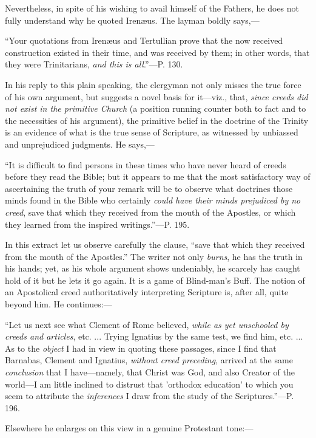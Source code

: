 Nevertheless, in spite of his wishing to avail
himself of the Fathers, he does not fully understand why he quoted
Irenæus. The layman boldly says,—

``Your
quotations from Irenæus and Tertullian prove that the now received
construction existed in their time, and was received by them; in other
words, that they were Trinitarians, \emph{and this is all}.''—P. 130.

In his reply to this plain speaking, the
clergyman not only misses the true force of his own argument, but
suggests a novel basis for it—viz., that, \emph{since creeds did not
exist in the primitive Church} (a position running counter both to
fact and to the necessities of his argument), the primitive belief in
the doctrine of the Trinity is an evidence of what is the true sense
of Scripture, as witnessed by unbiassed and unprejudiced judgments. He
says,—

``It
is difficult to find persons in these times who have never heard of
creeds before they read the Bible; but it appears to me that the most
satisfactory way of ascertaining the truth of your remark will be to
observe what doctrines those minds found in the Bible who certainly \emph{could
have their minds prejudiced by no creed}, save that which they
received from the mouth of the Apostles, or which they learned from
the inspired writings.''—P. 195.

In this extract let us observe carefully the
clause, ``save that which they received from the mouth of the Apostles.''
The writer not only \emph{burns}, he has the truth in his hands; yet,
as his whole argument shows undeniably, he scarcely has caught hold of
it but he lets it go again. It is a game of Blind-man's Buff. The
notion of an Apostolical creed authoritatively interpreting Scripture
is, after all, quite beyond him. He continues:—

``Let us next see
what Clement of Rome believed, \emph{while as yet unschooled by creeds
and articles}, etc. ... Trying Ignatius by the same test, we find
him, etc. ... As to the \emph{object} I had in view in quoting these
passages, since I find that Barnabas, Clement and Ignatius, \emph{without
creed preceding}, arrived at the same \emph{conclusion} that I
have—namely, that Christ was God, and also Creator of the world—I
am little inclined to distrust that 'orthodox education' to which you
seem to attribute the \emph{inferences} I draw from the study of the
Scriptures.''—P. 196.

Elsewhere he enlarges on this view in a genuine
Protestant tone:—

